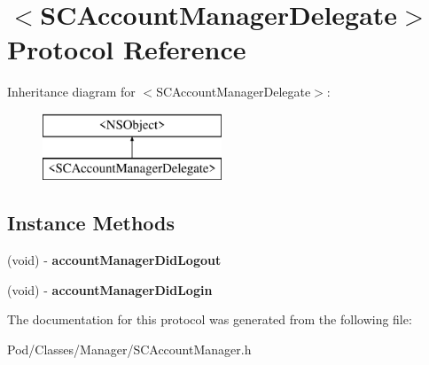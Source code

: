 \hypertarget{protocol_s_c_account_manager_delegate-p}{}\section{$<$S\+C\+Account\+Manager\+Delegate$>$ Protocol Reference}
\label{protocol_s_c_account_manager_delegate-p}
Inheritance diagram for $<$S\+C\+Account\+Manager\+Delegate$>$\+:\begin{figure}[H]
\begin{center}
\leavevmode
\includegraphics[height=2.000000cm]{protocol_s_c_account_manager_delegate-p}
\end{center}
\end{figure}
\subsection*{Instance Methods}
\begin{DoxyCompactItemize}
\item 
(void) -\/ {\bfseries account\+Manager\+Did\+Logout}\hypertarget{protocol_s_c_account_manager_delegate-p_a1c6252bdf32072ad58a99ba2af33db4e}{}\label{protocol_s_c_account_manager_delegate-p_a1c6252bdf32072ad58a99ba2af33db4e}

\item 
(void) -\/ {\bfseries account\+Manager\+Did\+Login}\hypertarget{protocol_s_c_account_manager_delegate-p_a56b77aef97a80b936df7d0f771e7a968}{}\label{protocol_s_c_account_manager_delegate-p_a56b77aef97a80b936df7d0f771e7a968}

\end{DoxyCompactItemize}


The documentation for this protocol was generated from the following file\+:\begin{DoxyCompactItemize}
\item 
Pod/\+Classes/\+Manager/S\+C\+Account\+Manager.\+h\end{DoxyCompactItemize}
